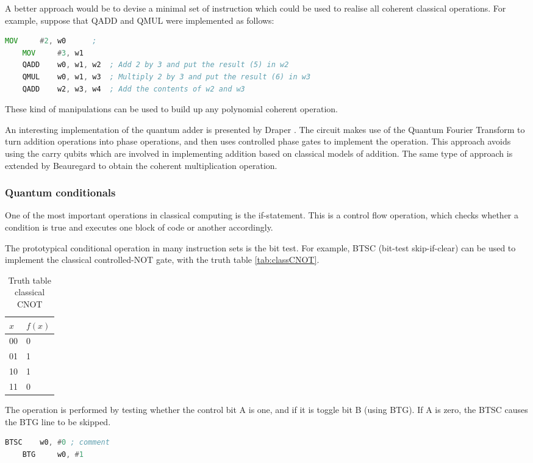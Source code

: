 A better approach would be to devise a minimal set of instruction which could be used to realise all coherent classical operations. For example, suppose that QADD and QMUL were implemented as follows:
\begin{lstlisting}[language=asm]
    MOV     #2, w0      ; 
    MOV     #3, w1   
    QADD    w0, w1, w2  ; Add 2 by 3 and put the result (5) in w2
    QMUL    w0, w1, w3  ; Multiply 2 by 3 and put the result (6) in w3 
    QADD    w2, w3, w4  ; Add the contents of w2 and w3
\end{lstlisting}
These kind of manipulations can be used to build up any polynomial coherent operation. 

An interesting implementation of the quantum adder is presented by Draper \cite{draper2000addition}. The circuit makes use of the Quantum Fourier Transform to turn addition operations into phase operations, and then uses controlled phase gates to implement the operation. This approach avoids using the carry qubits which are involved in implementing addition based on classical models of addition. The same type of approach is extended by Beauregard \cite{beauregard2003ShorImplementation} to obtain the coherent multiplication operation.


\subsubsection{Quantum conditionals}

One of the most important operations in classical computing is the if-statement. This is a control flow operation, which checks whether a condition is true and executes one block of code or another accordingly.

The prototypical conditional operation in many instruction sets is the bit test. For example, BTSC (bit-test skip-if-clear) can be used to implement the classical controlled-NOT gate, with the truth table 
\autoref{tab:classCNOT}.
\begin{table}[!htb]
    \caption{Truth table classical CNOT}
    \label{tab:classCNOT}
      \centering
        \begin{tabular}{|l||l|}
        \hline
        $x$ & $f(x)$ \\ \hline
        00  & 0      \\ 
        01  & 1       \\ 
        10  & 1       \\ 
        11  & 0       \\
        \hline
    \end{tabular}
\end{table}
The operation is performed by testing whether the control bit A is one, and if it is toggle bit B (using BTG). If A is zero, the BTSC causes the BTG line to be skipped.
\begin{lstlisting}[language=asm]
    BTSC    w0, #0 ; comment
    BTG     w0, #1
\end{lstlisting}

